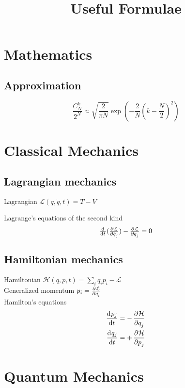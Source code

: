 \documentclass{article}
\begin{document}
\title{Useful Formulae}
\maketitle

\section{Mathematics}
\subsection{Approximation}
\begin{equation}
	\frac{C_N^k}{2^N}\approx\sqrt{\frac{2}{\pi N}}\exp(-\frac{2}{N}(k-\frac{N}{2})^2)
\end{equation}

\section{Classical Mechanics}
\subsection{Lagrangian mechanics}
Lagrangian $\mathcal{L}(q,\dot q, t) = T - V$\par
Lagrange's equations of the second kind
\begin{equation}
\label{eq:LagrangeEquation}
\od{}{t}(\pd{\mathcal{L}}{\dot q_j})-\pd{\mathcal{L}}{q_j}=0
\end{equation}

\subsection{Hamiltonian mechanics}
Hamiltonian $\mathcal{H}(q, p, t)=\sum_{i}\dot q_i p_i - \mathcal{L}$\\
Generalized momentum $p_i = \pd{\mathcal{L}}{\dot q_i}$\\
Hamilton's equations
\begin{subequations}
\begin{align}
\dod{p_j}{t}&=-\dpd{\mathcal H}{q_j}\\
\dod{q_j}{t}&=+\dpd{\mathcal H}{p_j}
\end{align}
\end{subequations}

\section{Quantum Mechanics}
\end{document}

